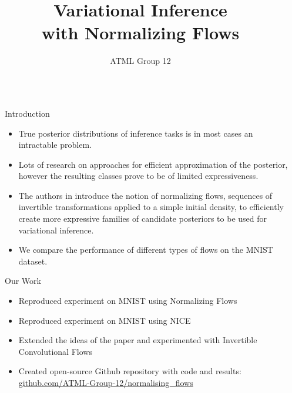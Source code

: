 \documentclass[final,hyperref={pdfpagelabels=false}]{beamer}
\title{\Huge Variational Inference\\ with Normalizing Flows} %
\author{ATML Group 12}
\institute{Department of Computer Science, University of Oxford\\\vspace{4mm}
\texttt{1032626, 1034125, 1034129, 1036969}}
\newcommand{\shrink}{-15pt}
\begin{document}

\begin{frame}[t] %

\begin{columns}[t] %

  \begin{column}{.02\textwidth}\end{column} %


  \begin{column}{.3\textwidth} %

    \vspace{\shrink}          
    \begin{block}{Introduction}
      \begin{itemize}
          \item True posterior distributions of inference tasks is in most cases an intractable problem.
          \item Lots of research on approaches for efficient approximation of the posterior, however the resulting classes prove to be of limited expressiveness.
          \item The authors in \cite{flows} introduce the notion of normalizing flows, sequences of invertible transformations applied to a simple initial density, to efficiently create more expressive families of candidate posteriors to be used for variational inference.
          \item We compare the performance of different types of flows on the MNIST dataset.
      \end{itemize}


    \end{block}

    \begin{block}{Our Work}
      \begin{itemize}
          \item Reproduced experiment on MNIST using Normalizing Flows
          \item Reproduced experiment on MNIST using NICE
          \item Extended the ideas of the paper and experimented with Invertible Convolutional Flows
          \item Created open-source Github repository with code and results: \url{github.com/ATML-Group-12/normalising_flows} 
      \end{itemize}
    \end{block}


\end{column}
\end{columns}
\end{frame}
\end{document}
